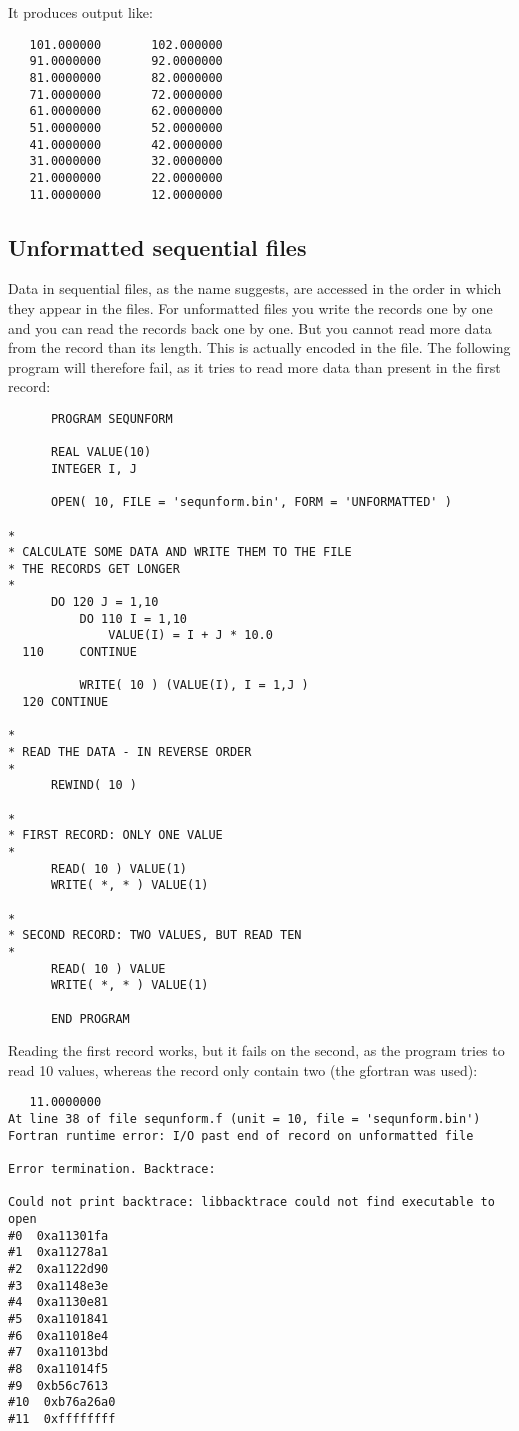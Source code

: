 It produces output like:
\begin{verbatim}
   101.000000       102.000000
   91.0000000       92.0000000
   81.0000000       82.0000000
   71.0000000       72.0000000
   61.0000000       62.0000000
   51.0000000       52.0000000
   41.0000000       42.0000000
   31.0000000       32.0000000
   21.0000000       22.0000000
   11.0000000       12.0000000
\end{verbatim}


\subsection{Unformatted sequential files}
Data in sequential files, as the name suggests, are accessed in the order in which they appear in the files.
For unformatted files you write the records one by one and you can read the records back one by one.
But you cannot read more data from the record than its length. This is actually encoded in the file.
The following program will therefore fail, as it tries to read more data than present in the first
record:

\begin{verbatim}
      PROGRAM SEQUNFORM

      REAL VALUE(10)
      INTEGER I, J

      OPEN( 10, FILE = 'sequnform.bin', FORM = 'UNFORMATTED' )

*
* CALCULATE SOME DATA AND WRITE THEM TO THE FILE
* THE RECORDS GET LONGER
*
      DO 120 J = 1,10
          DO 110 I = 1,10
              VALUE(I) = I + J * 10.0
  110     CONTINUE

          WRITE( 10 ) (VALUE(I), I = 1,J )
  120 CONTINUE

*
* READ THE DATA - IN REVERSE ORDER
*
      REWIND( 10 )

*
* FIRST RECORD: ONLY ONE VALUE
*
      READ( 10 ) VALUE(1)
      WRITE( *, * ) VALUE(1)

*
* SECOND RECORD: TWO VALUES, BUT READ TEN
*
      READ( 10 ) VALUE
      WRITE( *, * ) VALUE(1)

      END PROGRAM
\end{verbatim}

Reading the first record works, but it fails on the second, as the program
tries to read 10 values, whereas the record only contain two (the gfortran was used):

\begin{verbatim}
   11.0000000
At line 38 of file sequnform.f (unit = 10, file = 'sequnform.bin')
Fortran runtime error: I/O past end of record on unformatted file

Error termination. Backtrace:

Could not print backtrace: libbacktrace could not find executable to open
#0  0xa11301fa
#1  0xa11278a1
#2  0xa1122d90
#3  0xa1148e3e
#4  0xa1130e81
#5  0xa1101841
#6  0xa11018e4
#7  0xa11013bd
#8  0xa11014f5
#9  0xb56c7613
#10  0xb76a26a0
#11  0xffffffff
\end{verbatim}

